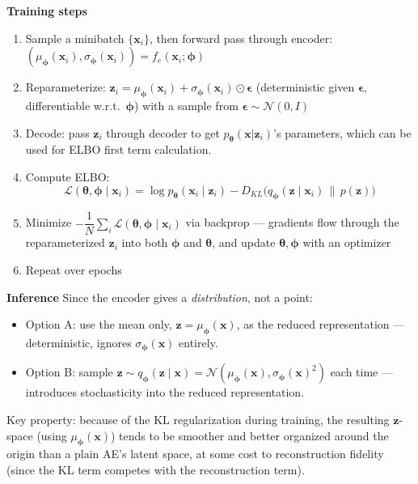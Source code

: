\documentclass[11pt]{article}
\begin{document}
\textbf{Training steps}
\begin{enumerate}
    \item Sample a minibatch $\{\boldsymbol{x}_i\}$, then forward pass through encoder: $(\mu_{\boldsymbol{\phi}}(\boldsymbol{x}_i), \sigma_{\boldsymbol{\phi}}(\boldsymbol{x}_i)) = f_e(\boldsymbol{x}_i;\boldsymbol{\phi})$
    \item Reparameterize: $\boldsymbol{z}_i = \mu_{\boldsymbol{\phi}}(\boldsymbol{x}_i) + \sigma_{\boldsymbol{\phi}}(\boldsymbol{x}_i)\odot \boldsymbol{\epsilon}$ (deterministic given $\boldsymbol{\epsilon}$, differentiable w.r.t.\ $\boldsymbol{\phi}$) with a sample from $\boldsymbol{\epsilon} \sim \mathcal{N}(0,I)$
    \item Decode: pass $\boldsymbol{z}_i$ through decoder to get $p_{\boldsymbol{\theta}}(\boldsymbol{x}|\boldsymbol{z}_i)$'s parameters, which can be used for ELBO first term calculation.
    \item Compute ELBO:
    \[
        \mathcal{L}(\boldsymbol{\theta},\boldsymbol{\phi} \mid \boldsymbol{x}_i) = \log p_{\boldsymbol{\theta}}(\boldsymbol{x}_i \mid \boldsymbol{z}_i) - D_{KL}\big(q_{\boldsymbol{\phi}}(\boldsymbol{z} \mid \boldsymbol{x}_i)\,\|\,p(\boldsymbol{z})\big)
    \]
    \item Minimize $-\dfrac{1}{N}\sum_{i} \mathcal{L}(\boldsymbol{\theta},\boldsymbol{\phi} \mid \boldsymbol{x}_i)$ via backprop --- gradients flow through the reparameterized $\boldsymbol{z}_i$ into both $\boldsymbol{\phi}$ and $\boldsymbol{\theta}$, and update $\boldsymbol{\theta}, \boldsymbol{\phi}$ with an optimizer
    \item Repeat over epochs
\end{enumerate}

\textbf{Inference}
Since the encoder gives a \emph{distribution}, not a point:
\begin{itemize}
    \item Option A: use the mean only, $\boldsymbol{z} = \mu_{\boldsymbol{\phi}}(\boldsymbol{x})$, as the reduced representation --- deterministic, ignores $\sigma_{\boldsymbol{\phi}}(\boldsymbol{x})$ entirely. 
    \item Option B: sample $\boldsymbol{z} \sim q_{\boldsymbol{\phi}}(\boldsymbol{z}\mid \boldsymbol{x}) = \mathcal{N}(\mu_{\boldsymbol{\phi}}(\boldsymbol{x}), \sigma_{\boldsymbol{\phi}}(\boldsymbol{x})^2)$ each time --- introduces stochasticity into the reduced representation.
\end{itemize}
Key property: because of the KL regularization during training, the resulting $\boldsymbol{z}$-space (using $\mu_{\boldsymbol{\phi}}(\boldsymbol{x})$) tends to be smoother and better organized around the origin than a plain AE's latent space, at some cost to reconstruction fidelity (since the KL term competes with the reconstruction term).
\end{document}

